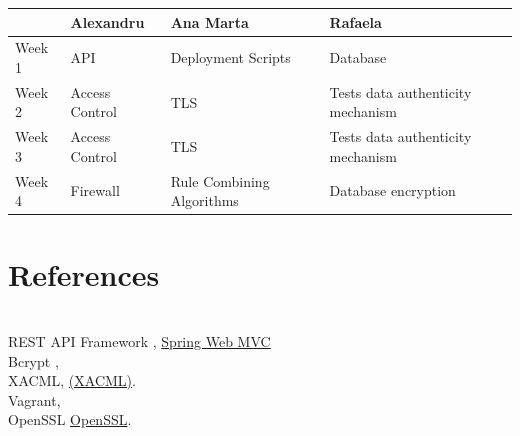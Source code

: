 \begin{tabularx}{0.8\textwidth} { 
  | >{\centering\arraybackslash}X 
  | >{\centering\arraybackslash}X 
  | >{\centering\arraybackslash}X 
  | >{\centering\arraybackslash}X | }
 \hline
  & Alexandru & Ana Marta & Rafaela \\
 \hline
 Week 1  & API & Deployment Scripts & Database \\
  \hline
  Week 2  & Access Control  & TLS & Tests data authenticity mechanism \\
   \hline
   Week 3  & Access Control  & TLS  & Tests data authenticity mechanism \\
    \hline
    Week 4  & Firewall  & Rule Combining Algorithms  & Database encryption \\
\hline
\end{tabularx}

\section{References}

\\
[1] REST API Framework , \href{https://docs.spring.io/spring-framework/docs/3.2.x/spring-framework-reference/html/mvc.html}{Spring Web MVC} \\
[2] Bcrypt ,  \href{https://auth0.com/blog/hashing-in-action-understanding-bcrypt/} \\
[3] XACML, \href{https://www.oasis-open.org/committees/tc_home.php?wg_abbrev=xacml#other}{(XACML)}.\\
[4] Vagrant, \href{https://www.vagrantup.com/}\\
[5] OpenSSL  \href{https://www.openssl.org/}{OpenSSL}. \\



